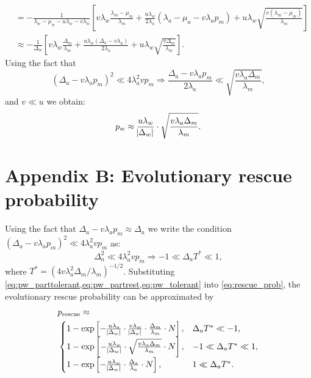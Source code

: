 \documentclass[12pt]{extarticle}
\newcommand{\presc}{p_\text{rescue}}
\begin{document}
\begin{appendices}
\begin{equation}
\begin{aligned}
&=-\frac{1}{\lambda_w-\mu_w-u\lambda_w-v\lambda_w}\left[v\lambda_w\frac{\lambda_m-\mu_m}{\lambda_m}+\frac{u\lambda_w}{2\lambda_a}\left(\lambda_a-\mu_a-v\lambda_ap_m\right)+u\lambda_w\sqrt{\frac{v\left(\lambda_m-\mu_m\right)}{\lambda_m}}\right]\\
&\approx-\frac{1}{\Delta_w}\left[v\lambda_w\frac{\Delta_m}{\lambda_m}+\frac{u\lambda_w\left(\Delta_a-v\lambda_a\right)}{2\lambda_a}+u\lambda_w\sqrt{\frac{v\Delta_m}{\lambda_m}}\right].
\end{aligned}
\end{equation}
Using the fact that
\begin{equation*}
\left(\Delta_a-v\lambda_ap_m\right)^2 \ll 4\lambda_a^2vp_m\Rightarrow\frac{\Delta_a-v\lambda_ap_m}{2\lambda_a} \ll \sqrt{\frac{v\lambda_a\Delta_m}{\lambda_m}},
\end{equation*}
and $v\ll u$ we obtain:
\begin{equation}\label{eq:pw_partrest}
p_w\approx\frac{u\lambda_w}{\abs{\Delta_w}}\cdot\sqrt{\frac{v\lambda_a\Delta_m}{\lambda_m}}.
\end{equation}

\section*{Appendix B: Evolutionary rescue probability}\label{sec:appendix-rescue-prob}
Using the fact that $\Delta_a-v\lambda_ap_m\approx\Delta_a$ we write the condition $\left(\Delta_a-v\lambda_ap_m\right)^2 \ll 4\lambda_a^2vp_m$ as:
\begin{equation*}
\Delta_a^2 \ll 4\lambda_a^2vp_m\Rightarrow -1\ll\Delta_aT^*\ll1,
\end{equation*}
where $T^* = (4 v \lambda_a^2 \Delta_m/\lambda_m)^{-1/2}$.
Substituting \cref{eq:pw_parttolerant,eq:pw_partrest,eq:pw_tolerant} into \cref{eq:rescue_prob}, the evolutionary rescue probability can be approximated by
\begin{equation}\label{rescue_prob_approx}
\begin{aligned}
&\presc \approx \\
  &\begin{cases}
   1-\exp\left[-\frac{u\lambda_a}{\abs{\Delta_w}}\cdot\frac{v\lambda_w}{\abs{\Delta_a}}\cdot\frac{\Delta_m}{\lambda_m}\cdot N\right] ,&
   \Delta_aT^*\ll-1 ,\\
   1-\exp\left[-\frac{u\lambda_w}{\abs{\Delta_w}}\cdot\sqrt{\frac{v\lambda_a\Delta_m}{\lambda_m}}\cdot N\right] ,&
  -1\ll\Delta_aT^*\ll1 ,\\
   1-\exp\left[-\frac{u\lambda_w}{\abs{\Delta_w}} \cdot \frac{\Delta_a}{\lambda_a}\cdot N\right] ,&
   1\ll\Delta_aT^*.
  \end{cases}
\end{aligned}
\end{equation}


\end{appendices}
\end{document}
